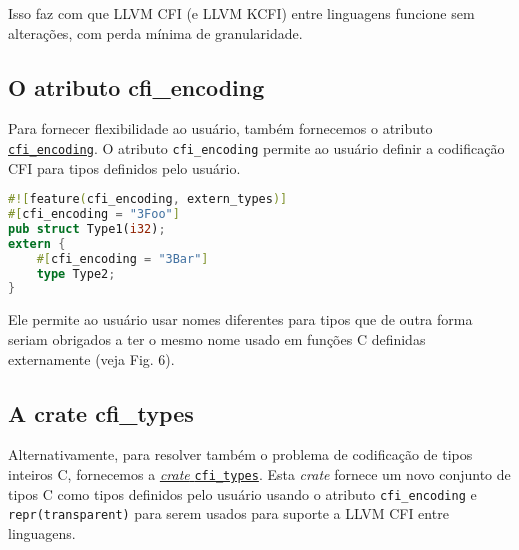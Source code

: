 \documentclass{article}
\begin{document}
Isso faz com que LLVM CFI (e LLVM KCFI) entre linguagens funcione sem alterações, com perda mínima de granularidade.\footnotemark[4]



\subsection{O atributo cfi\_encoding}

Para fornecer flexibilidade ao usuário, também fornecemos o atributo \texttt{\href{https://doc.rust-lang.org/nightly/unstable-book/language-features/cfi-encoding.html#cfi_encoding}{cfi\_encoding}}. O atributo \texttt{cfi\_encoding} permite ao usuário definir a codificação CFI para tipos definidos pelo usuário.

\begin{lstlisting}[language=Rust, caption={Exemplo de tipos definidos pelo usuário usando o atributo cfi\_encoding.}]
#![feature(cfi_encoding, extern_types)]
#[cfi_encoding = "3Foo"]
pub struct Type1(i32);
extern {
    #[cfi_encoding = "3Bar"]
    type Type2;
}
\end{lstlisting}

Ele permite ao usuário usar nomes diferentes para tipos que de outra forma seriam obrigados a ter o mesmo nome usado em funções C definidas externamente (veja Fig. 6).


\subsection{A crate cfi\_types}

Alternativamente, para resolver também o problema de codificação de tipos inteiros C, fornecemos a \href{https://github.com/rcvalle/rust-cfi-types}{\textit{crate} \texttt{cfi\_types}}. Esta \textit{crate} fornece um novo conjunto de tipos C como tipos definidos pelo usuário usando o atributo \texttt{cfi\_encoding} e \texttt{repr(transparent)} para serem usados para suporte a LLVM CFI entre linguagens.
\end{document}
